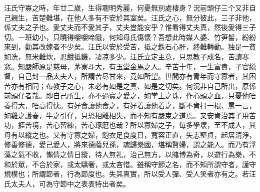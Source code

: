 \documentclass[a5paper, 12pt, openany]{book} %
\makeatletter
\renewcommand\chapter{\if@openright\cleardoublepage\else\clearpage\fi
  \thispagestyle{plain}%
  \global\@topnum\z@
  \@afterindentfalse
  \secdef\@chapter\@schapter}
\makeatother
\begin{document}
	汪氏守寡之時，年廿二歲，生得聰明秀麗，何憂無別處棲身？況前頭仔三个又非自己親生，苦楚難堪，在他人多有不安於其室矣。汪氏之心，無分彼此，三子非他，係丈夫之子也。愛丈夫而不愛其子，丈夫豈能安乎？惟看得丈夫真，然後愛得三子切。一班幼小，只曉得嚶嚶啼餓，何知母氏傷懷？吾想此時媒人婆、竹笋髻，紛紛來到，勸其改嫁者不少矣。汪氏以安於受苦，抵之鉄石心肝，終難轉動。独是一貧如洗，無米難炊，忍餓抵饑，凄凉多少。汪氏立定主意，只思教子成名，苦讀寒窓。知嚴師原是慈母，茅寮斗大，有玉堂金馬之人。辛苦十年，一生富貴，子官縂督，自己封一品太夫人，所謂苦尽甘來，竟如所望。世間亦有青年而守寡者，其困苦亦有相同；布教子之心，未必有如是之真、如是之切矣。何況非自己所出，原係前頭仔者哉。即自己所生，亦不過寶之愛之，如掌上之珠，作心頭之血，只憂他唔養得大，唔高得快。有好食讓他食之，有好着讓他着之，斷不肯打一棍、罵一言，如雞之護春，牛之引仔，只恐相離相失，而不知有嚴束之道焉。又安肯治其子用苦功，捱苦境，苦心習練，苦心琢磨也哉？所以寡婦之子，每多學壞，至不成人，其母有以縱之也。又有守寡之婦，飽衣足食度日，寬容正直，矢志堅貞，起居清淨，修善修德，愛己愛人，將來德蔭兒孫，魂歸樂國，堪稱賢婦，謂之能人。而乃有浮蕩之氣不收，懶情之情日縱，待人無礼，治己無方，以賭博為奇，以遊行為樂，不和於眾，不合於家，或太驕奢，或太吝惜。雖稱守節之名，而不知所謂守者，謹守規模也；所謂節者，行為節度也。失其真實，所以受人彈、受人笑者亦有之。若汪氏太夫人，可為守節中之表表特出者矣。

 

 
 

	\printindex %














\end{document}
